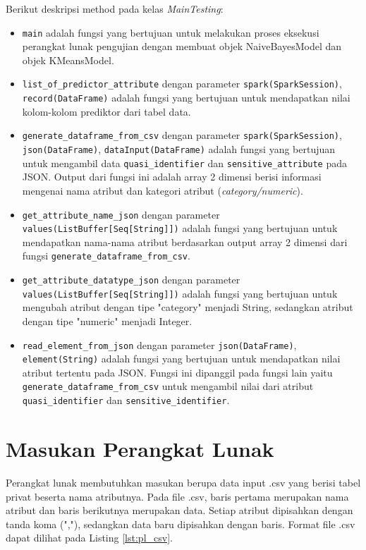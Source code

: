 \noindent Berikut deskripsi method pada kelas \textit{MainTesting}:

\begin{itemize}

\item \texttt{main} adalah fungsi yang bertujuan untuk melakukan proses eksekusi perangkat lunak pengujian dengan membuat objek NaiveBayesModel dan objek KMeansModel.

\item \texttt{list\_of\_predictor\_attribute} dengan parameter \texttt{spark(SparkSession)}, \texttt{record(DataFrame)} adalah fungsi yang bertujuan untuk mendapatkan nilai kolom-kolom prediktor dari tabel data.

\item \texttt{generate\_dataframe\_from\_csv} dengan parameter \texttt{spark(SparkSession)}, \texttt{json(DataFrame)}, \texttt{dataInput(DataFrame)} adalah fungsi yang bertujuan untuk mengambil data \texttt{quasi\_identifier} dan \texttt{sensitive\_attribute} pada JSON. Output dari fungsi ini adalah array 2 dimensi berisi informasi mengenai nama atribut dan kategori atribut (\textit{category/numeric}).

\item \texttt{get\_attribute\_name\_json} dengan parameter \texttt{values(ListBuffer[Seq[String]])} adalah fungsi yang bertujuan untuk mendapatkan nama-nama atribut berdasarkan output array 2 dimensi dari fungsi \texttt{generate\_dataframe\_from\_csv}.

\item \texttt{get\_attribute\_datatype\_json} dengan parameter \texttt{values(ListBuffer[Seq[String]])} adalah fungsi yang bertujuan untuk mengubah atribut dengan tipe "category" menjadi String, sedangkan atribut dengan tipe "numeric" menjadi Integer. 

\item \texttt{read\_element\_from\_json} dengan parameter \texttt{json(DataFrame)}, \texttt{element(String)} adalah fungsi yang bertujuan untuk mendapatkan nilai atribut tertentu pada JSON. Fungsi ini dipanggil pada fungsi lain yaitu \texttt{generate\_dataframe\_from\_csv} untuk mengambil nilai dari atribut \texttt{quasi\_identifier} dan \texttt{sensitive\_identifier}.

\end{itemize}


\section{Masukan Perangkat Lunak}
Perangkat lunak membutuhkan masukan berupa data input .csv yang berisi tabel privat beserta nama atributnya. Pada file .csv, baris pertama merupakan nama atribut dan baris berikutnya merupakan data. Setiap atribut dipisahkan dengan tanda koma (","), sedangkan data baru dipisahkan dengan baris. Format file .csv dapat dilihat pada Listing \ref{lst:pl_csv}.

